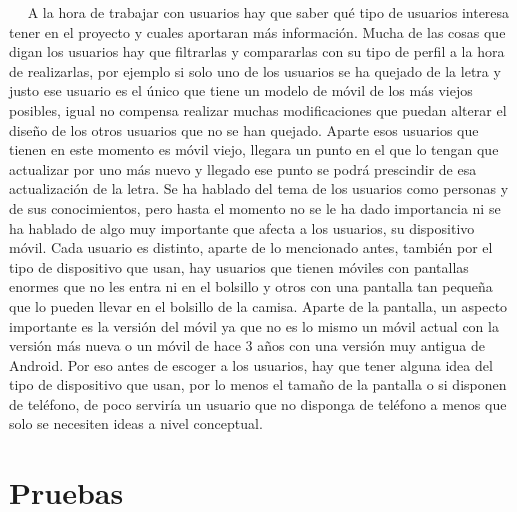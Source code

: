  
A la hora de trabajar con usuarios hay que saber qué tipo de usuarios interesa tener en el proyecto y cuales aportaran más información.
Mucha de las cosas que digan los usuarios hay que filtrarlas y compararlas con su tipo de perfil a la hora de realizarlas, por ejemplo si solo uno de los usuarios se ha quejado de la letra y justo ese usuario es el único que tiene un modelo de móvil de los más viejos posibles, igual no compensa realizar muchas modificaciones que puedan alterar el diseño de los otros usuarios que no se han quejado. Aparte esos usuarios que tienen en este momento es móvil viejo, llegara un punto en el que lo tengan que actualizar por uno más nuevo y llegado ese punto se podrá prescindir de esa actualización de la letra.
Se ha hablado del tema de los usuarios como personas y de sus conocimientos, pero hasta el momento no se le ha dado importancia ni se ha hablado de algo muy importante que afecta a los usuarios, su dispositivo móvil. 
Cada usuario es distinto, aparte de lo mencionado antes, también por el tipo de dispositivo que usan, hay usuarios que tienen móviles con pantallas enormes que no les entra ni en el bolsillo y otros con una pantalla tan pequeña que lo pueden llevar en el bolsillo de la camisa.
Aparte de la pantalla, un aspecto importante es la versión del móvil ya que no es lo mismo un móvil actual con la versión más nueva o un móvil de hace 3 años con una versión muy antigua de Android.
Por eso antes de escoger a los usuarios, hay que tener alguna idea del tipo de dispositivo que usan, por lo menos el tamaño de la pantalla o si disponen de teléfono, de poco serviría un usuario que no disponga de teléfono a menos que solo se necesiten ideas a nivel conceptual.




\section{Pruebas}
\label{secc:pruebas}

